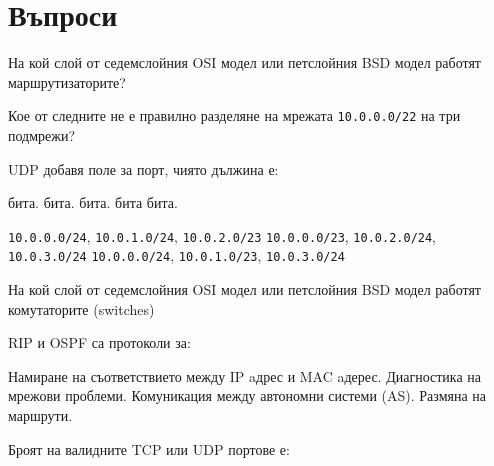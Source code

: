 \section*{Въпроси}

\begin{questions}

  \question[6] На кой слой от седемслойния OSI модел или петслойния BSD модел
  работят маршрутизаторите?
  \begin{oneparchoices}
  \end{oneparchoices}

  \question[10] Кое от следните не е правилно разделяне на мрежата
  \texttt{10.0.0.0/22} на три подмрежи?

  \question[6] UDP добавя поле за порт, чиято дължина е:
  \begin{oneparchoices}
     бита.
     бита.
     бита.
     бита
     бита.
  \end{oneparchoices}

  \begin{choices}
    \choice \texttt{10.0.0.0/24}, \texttt{10.0.1.0/24}, \texttt{10.0.2.0/23}
    \CorrectChoice \texttt{10.0.0.0/23}, \texttt{10.0.2.0/24}, \texttt{10.0.3.0/24}
    \choice \texttt{10.0.0.0/24}, \texttt{10.0.1.0/23}, \texttt{10.0.3.0/24}
  \end{choices}

  \question[6] На кой слой от седемслойния OSI модел или петслойния BSD модел
  работят комутаторите (\foreignlanguage{english}{switches})
  \begin{oneparchoices}
  \end{oneparchoices}

  \question[6] RIP и OSPF са протоколи за:
  \begin{choices}
    \choice Намиране на съответствието между IP aдрес и MAC aдерес.
    \choice Диагностика на мрежови проблеми.
    \choice Комуникация между автономни системи (AS).
    \CorrectChoice Размяна на маршрути.
  \end{choices}

  \question[6] Броят на валидните TCP или UDP портове е:
  \begin{oneparchoices}
  \end{oneparchoices}


\end{questions}

